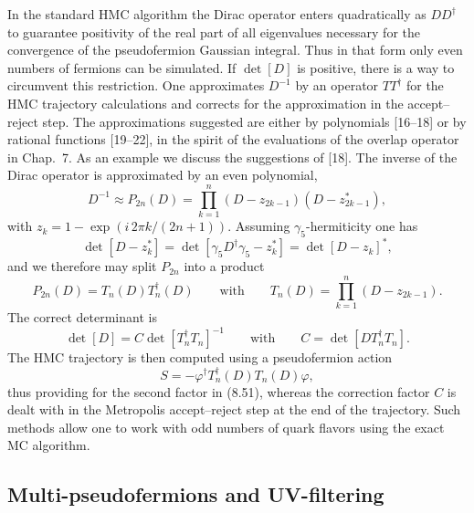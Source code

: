 In the standard HMC algorithm the Dirac operator enters quadratically as
$DD^\dagger$ to guarantee positivity of the real part of all eigenvalues
necessary for the convergence of the pseudofermion Gaussian integral. Thus in
that form only even numbers of fermions can be simulated.
If $\det[D]$ is positive, there is a way to circumvent this restriction. One
approximates $D^{-1}$ by an operator $TT^\dagger$ for the HMC trajectory
calculations and corrects for the approximation in the accept--reject step. The
approximations suggested are either by polynomials [16--18] or by rational
functions [19--22], in the spirit of the evaluations of the overlap operator in
Chap.~7.
As an example we discuss the suggestions of [18]. The inverse of the Dirac
operator is approximated by an even polynomial,
\begin{equation}
D^{-1} \approx P_{2n}(D) = \prod_{k=1}^{n}(D - z_{2k-1})(D - z_{2k-1}^*),
\end{equation}
with $z_k = 1 - \exp(i\,2\pi k/(2n+1))$. Assuming $\gamma_5$-hermiticity one
has
\begin{equation}
\det[D - z_k^*] = \det[\gamma_5 D^\dagger\gamma_5 - z_k^*] = \det[D - z_k]^*,
\end{equation}
and we therefore may split $P_{2n}$ into a product
\begin{equation}
P_{2n}(D) = T_n(D)T_n^\dagger(D) \qquad \text{with} \qquad
T_n(D) = \prod_{k=1}^{n}(D - z_{2k-1}).
\end{equation}
The correct determinant is
\begin{equation}
\det[D] = C\det[T_n^\dagger T_n]^{-1} \qquad \text{with} \qquad
C = \det[DT_n^\dagger T_n].
\end{equation}
The HMC trajectory is then computed using a pseudofermion action
\begin{equation}
S = -\varphi^\dagger T_n^\dagger(D)T_n(D)\varphi,
\end{equation}
thus providing for the second factor in (8.51), whereas the correction factor
$C$ is dealt with in the Metropolis accept--reject step at the end of the
trajectory. Such methods allow one to work with odd numbers of quark flavors
using the exact MC algorithm.

\subsection{Multi-pseudofermions and UV-filtering}


